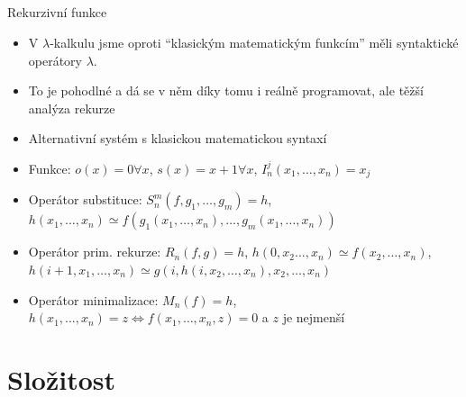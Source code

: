 \documentclass{beamer}
\begin{document}
\subsection{}
\begin{frame}{Rekurzivní funkce}
\begin{itemize}
\item V $\lambda$-kalkulu jsme oproti ``klasickým matematickým funkcím'' měli syntaktické operátory $\lambda.$
\item To je pohodlné a dá se v něm díky tomu i reálně programovat, ale těžší analýza rekurze
\item Alternativní systém s klasickou matematickou syntaxí
\pause
\item Funkce: $o(x) = 0 \forall x$, $s(x) = x+1 \forall x$, $I^j_n(x_1,\ldots,x_n) = x_j$
\item Operátor substituce: $S_n^m(f,g_1,\ldots,g_m)=h$, $h(x_1,\ldots,x_n) \simeq f(g_1(x_1,\ldots,x_n),\ldots,g_m(x_1,\ldots,x_n))$
\item Operátor prim. rekurze: $R_n(f,g)=h$, $h(0,x_2\ldots,x_n) \simeq f(x_2,\ldots,x_n)$,
	$h(i+1,x_1,\ldots,x_n) \simeq g(i, h(i,x_2,\ldots,x_n), x_2,\ldots,x_n)$
\pause
\item Operátor minimalizace: $M_n(f) = h$, $h(x_1,\ldots,x_n) = z \Leftrightarrow f(x_1,\ldots,x_n,z)=0$ a $z$ je nejmenší
\end{itemize}
\end{frame}

\subsection{}

\section{Složitost}
\end{document}
